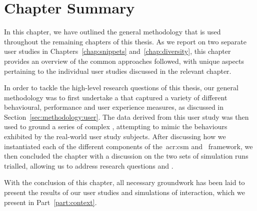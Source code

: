 \section{Chapter Summary}
In this chapter, we have outlined the general methodology that is used throughout the remaining chapters of this thesis. As we report on two separate user studies in Chapters~\ref{chap:snippets} and~\ref{chap:diversity}, this chapter provides an overview of the common approaches followed, with unique aspects pertaining to the individual user studies discussed in the relevant chapter.

In order to tackle the high-level research questions of this thesis, our general methodology was to first undertake a  that captured a variety of different behavioural, performance and user experience measures, as discussed in Section~\ref{sec:methodology:user}. The data derived from this user study was then used to ground a series of complex , attempting to mimic the behaviours exhibited by the real-world user study subjects. After discussing how we instantiated each of the different components of the~\gls{acr:csm} and \simiir~framework, we then concluded the chapter with a discussion on the two sets of simulation runs trialled, allowing us to address research questions  and .

With the conclusion of this chapter, all necessary groundwork has been laid to present the results of our user studies and simulations of interaction, which we present in Part~\ref{part:context}.